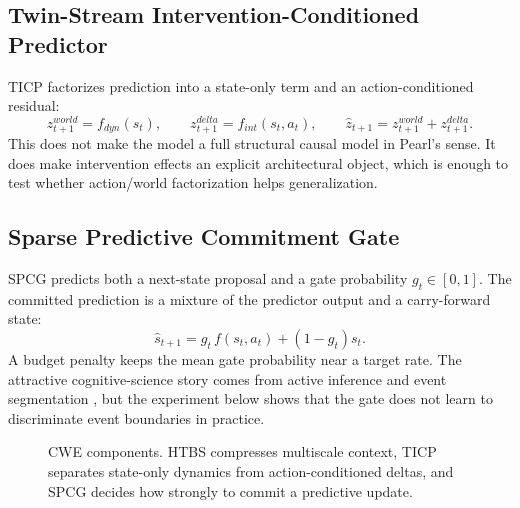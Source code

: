 \documentclass[11pt]{article}
\begin{document}
\subsection{Twin-Stream Intervention-Conditioned Predictor}
TICP factorizes prediction into a state-only term and an action-conditioned residual:
\[
 z^{world}_{t+1} = f_{dyn}(s_t), \qquad z^{delta}_{t+1} = f_{int}(s_t, a_t), \qquad \hat z_{t+1} = z^{world}_{t+1} + z^{delta}_{t+1}.
\]
This does not make the model a full structural causal model in Pearl's sense. It does make intervention effects an explicit architectural object, which is enough to test whether action/world factorization helps generalization.

\subsection{Sparse Predictive Commitment Gate}
SPCG predicts both a next-state proposal and a gate probability $g_t \in [0,1]$. The committed prediction is a mixture of the predictor output and a carry-forward state:
\[
 \hat s_{t+1} = g_t \, f(s_t, a_t) + (1-g_t) s_t.
\]
A budget penalty keeps the mean gate probability near a target rate. The attractive cognitive-science story comes from active inference and event segmentation \citep{friston2017active, zacks2007perception, zacks2007segmentation}, but the experiment below shows that the gate does not learn to discriminate event boundaries in practice.

\begin{figure}[t]
\centering
{}
\caption{CWE components. HTBS compresses multiscale context, TICP separates state-only dynamics from action-conditioned deltas, and SPCG decides how strongly to commit a predictive update.}
\label{fig:cwe-architecture}
\end{figure}
\end{document}
